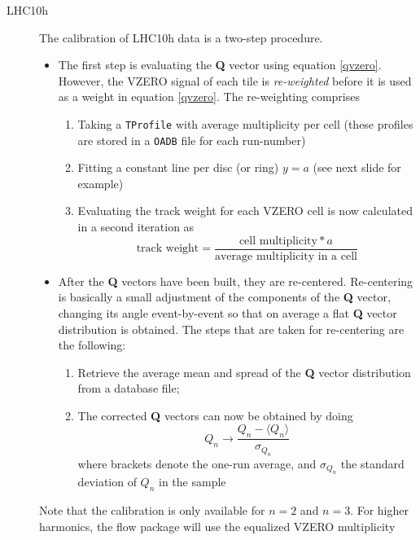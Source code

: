 \documentclass[a4paper]{book}
\numberwithin{equation}{subsection}
\begin{document}
\begin{description}
    \item [LHC10h]
The calibration of LHC10h data is a two-step procedure. 
\begin{itemize}
\item The first step is evaluating the \textbf{Q} vector using equation \ref{qvzero}. However, the VZERO signal of each tile is \emph{re-weighted} before it is used as a weight in equation \ref{qvzero}. The re-weighting comprises 
\begin{enumerate}
\item Taking a \texttt{TProfile} with average multiplicity per cell (these profiles are stored in a \texttt{OADB} file for each run-number)
\item Fitting a constant line per disc (or ring) $y = a$ (see next slide for example)
\item Evaluating the track weight for each VZERO cell is now calculated in a second iteration as
\begin{equation}
\mbox{track weight} = \frac{\mbox{cell multiplicity} * a}{\mbox{average multiplicity in a cell}} 
\end{equation}
\end{enumerate}
\item After the \textbf{Q} vectors have been built, they are re-centered. Re-centering is basically a small adjustment of the components of the \textbf{Q} vector, changing its angle event-by-event so that on average a flat \textbf{Q} vector distribution is obtained. The steps that are taken for re-centering are the following:
\begin{enumerate}
\item Retrieve the average mean and spread of the \textbf{Q} vector distribution from a database file;
\item The corrected \textbf{Q} vectors can now be obtained by doing
\begin{equation}
Q_n \longrightarrow \frac{Q_n - \langle Q_n \rangle }{\sigma_{Q_n}} 
\end{equation}
where brackets denote the one-run average, and $\sigma_{Q_n}$ the standard deviation of $Q_n$ in the sample
\end{enumerate}
\end{itemize}
Note that the calibration is only available for $n=2$ and $n=3$. For higher harmonics, the flow package will use the equalized VZERO multiplicity
\begin{lstlisting}[language=C, numbers=left]

\end{lstlisting}
\end{description}
\end{document}
